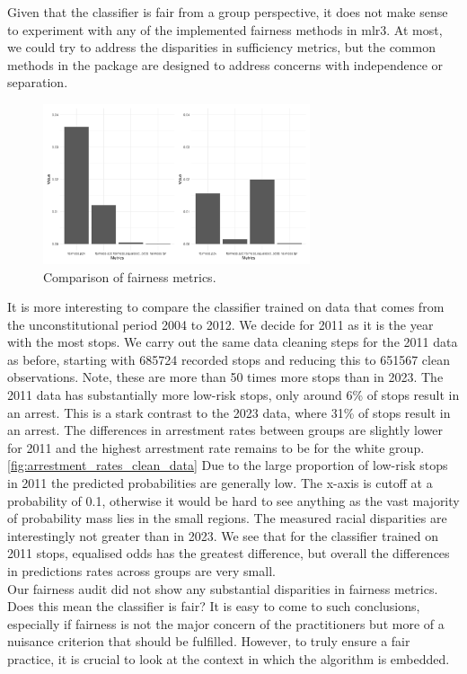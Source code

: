 Given that the classifier is fair from a group perspective, it does not make sense to experiment with any of the implemented fairness methods in mlr3. At most, we could try to address the disparities in sufficiency metrics, but the common methods in the package are designed to address concerns with independence or separation. \\
\begin{figure}
    \centering
    \includegraphics[width=0.7\textwidth]{../figures/sqf_case_study_plot8.png}
    \caption{Comparison of fairness metrics.}
    \label{fig:fairness_metrics_barplot}
\end{figure}

It is more interesting to compare the classifier trained on data that comes from the unconstitutional period 2004 to 2012. We decide for 2011 as it is the year with the most stops.
We carry out the same data cleaning steps for the 2011 data as before, starting with 685724 recorded stops and reducing this to 651567 clean observations. Note, these are more than 50 times more stops than in 2023.
The 2011 data has substantially more low-risk stops, only around 6\% of stops result in an arrest. This is a stark contrast to the 2023 data, where 31\% of stops result in an arrest.
The differences in arrestment rates between groups are slightly lower for 2011 and the highest arrestment rate remains to be for the white group. \autoref{fig:arrestment_rates_clean_data}
Due to the large proportion of low-risk stops in 2011 the predicted probabilities are generally low. The x-axis is cutoff at a probability of 0.1, otherwise it would be hard to see anything as the vast majority of probability mass lies in the small regions.
The measured racial disparities are interestingly not greater than in 2023. We see that for the classifier trained on 2011 stops, equalised odds has the greatest difference, but overall the differences in predictions rates across groups are very small. \\ 
Our fairness audit did not show any substantial disparities in fairness metrics. Does this mean the classifier is fair?
It is easy to come to such conclusions, especially if fairness is not the major concern of the practitioners but more of a nuisance criterion that should be fulfilled. However, to truly ensure a fair practice, it is crucial to look at the context in which the algorithm is embedded.

